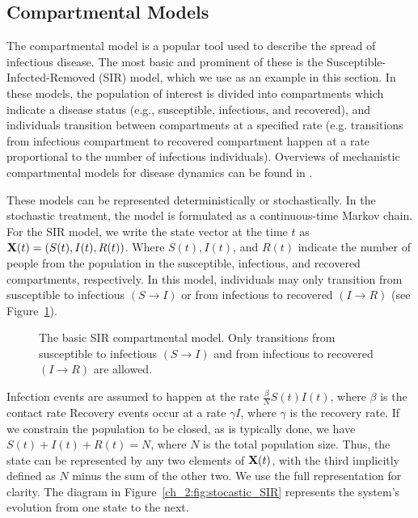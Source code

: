 \subsection{Compartmental Models}
\label{ch_2:sec:compartmental_models}
The compartmental model is a popular tool used to describe the spread of infectious disease.
The most basic and prominent of these is the Susceptible-Infected-Removed (SIR) model, which we use as an example in this section.
In these models, the population of interest is divided into compartments which indicate a disease status (e.g., susceptible, infectious, and recovered), and individuals transition between compartments at a specified rate
(e.g. transitions from infectious compartment to recovered compartment happen at a rate proportional to the number of infectious individuals).
Overviews of mechanistic compartmental models for disease dynamics can be found in \citet{anderson1992infectious, Brauer2008, keeling2011modeling, 10.1093/aje/kww021}.

These models can be represented deterministically or stochastically.
In the stochastic treatment, the model is formulated as a continuous-time Markov chain.
For the SIR model, we write the state vector at the time \( t \) as \( \mathbf{X}(t) = (S(t), I(t), R(t)) \).
Where \( S(t), I(t) \), and \( R(t) \) indicate the number of people from the population in the susceptible, infectious, and recovered compartments, respectively.
In this model, individuals may only transition from susceptible to infectious \( (S \to I) \) or from infectious to recovered \( (I \to R) \) (see Figure~\ref{ch_2:fig:SIR_diagram}).
\begin{figure}
    \centering
    \caption[The basic SIR compartmental model.]{The basic SIR compartmental model.
    Only transitions from susceptible to infectious \( (S \to I) \) and from infectious to recovered \( (I \to R) \) are allowed.}
    \label{ch_2:fig:SIR_diagram}
\end{figure}
Infection events are assumed to happen at the rate \( \frac{\beta}{N} S(t) I(t) \), where \( \beta \) is the contact rate
Recovery events occur at a rate \( \gamma I \), where \( \gamma \) is the recovery rate.
If we constrain the population to be closed, as is typically done, we have \(  S(t) + I(t) + R(t) = N \), where \( N \) is the total population size.
Thus, the state can be represented by any two elements of \( \mathbf{X} (t) \), with the third implicitly defined as \( N \) minus the sum of the other two.
We use the full representation for clarity.
The diagram in Figure~\ref{ch_2:fig:stocastic_SIR} represents the system's evolution from one state to the next.

